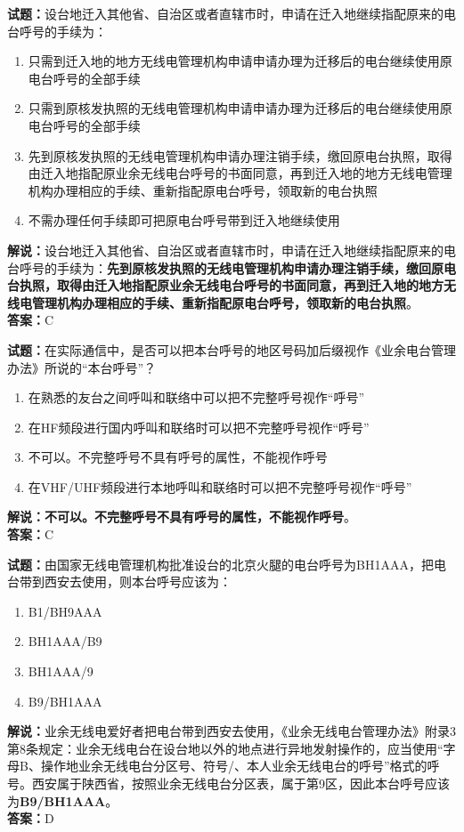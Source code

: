 \documentclass{ctexbook}
\begin{document}
\bigskip


\noindent\textbf{试题：}设台地迁入其他省、自治区或者直辖市时，申请在迁入地继续指配原来的电台呼号的手续为：
\begin{enumerate}[leftmargin=3em]
	\item 只需到迁入地的地方无线电管理机构申请申请办理为迁移后的电台继续使用原电台呼号的全部手续
	\item 只需到原核发执照的无线电管理机构申请申请办理为迁移后的电台继续使用原电台呼号的全部手续
	\item 先到原核发执照的无线电管理机构申请办理注销手续，缴回原电台执照，取得由迁入地指配原业余无线电台呼号的书面同意，再到迁入地的地方无线电管理机构办理相应的手续、重新指配原电台呼号，领取新的电台执照
	\item 不需办理任何手续即可把原电台呼号带到迁入地继续使用
\end{enumerate}
\noindent\textbf{解说：}设台地迁入其他省、自治区或者直辖市时，申请在迁入地继续指配原来的电台呼号的手续为：\textbf{先到原核发执照的无线电管理机构申请办理注销手续，缴回原电台执照，取得由迁入地指配原业余无线电台呼号的书面同意，再到迁入地的地方无线电管理机构办理相应的手续、重新指配原电台呼号，领取新的电台执照}。\\\noindent\textbf{答案：}C




\bigskip


\noindent\textbf{试题：}在实际通信中，是否可以把本台呼号的地区号码加后缀视作《业余电台管理办法》所说的“本台呼号”？
\begin{enumerate}[leftmargin=3em]
	\item 在熟悉的友台之间呼叫和联络中可以把不完整呼号视作“呼号”
	\item 在HF频段进行国内呼叫和联络时可以把不完整呼号视作“呼号”
	\item 不可以。不完整呼号不具有呼号的属性，不能视作呼号
	\item 在VHF/UHF频段进行本地呼叫和联络时可以把不完整呼号视作“呼号”
\end{enumerate}
\textbf{解说：不可以。不完整呼号不具有呼号的属性，不能视作呼号}。\\\noindent\textbf{答案：}C


\bigskip


\noindent\textbf{试题：}由国家无线电管理机构批准设台的北京火腿的电台呼号为BH1AAA，把电台带到西安去使用，则本台呼号应该为：
\begin{enumerate}[leftmargin=3em]
	\item B1/BH9AAA
	\item BH1AAA/B9
	\item BH1AAA/9
	\item B9/BH1AAA
\end{enumerate}
\noindent\textbf{解说：}业余无线电爱好者把电台带到西安去使用，《业余无线电台管理办法》附录3第8条规定：业余无线电台在设台地以外的地点进行异地发射操作的，应当使用“字母B、操作地业余无线电台分区号、符号/、本人业余无线电台的呼号”格式的呼号。西安属于陕西省，按照业余无线电台分区表，属于第9区，因此本台呼号应该为\textbf{B9/BH1AAA}。\\\noindent\textbf{答案：}D
\end{document}
